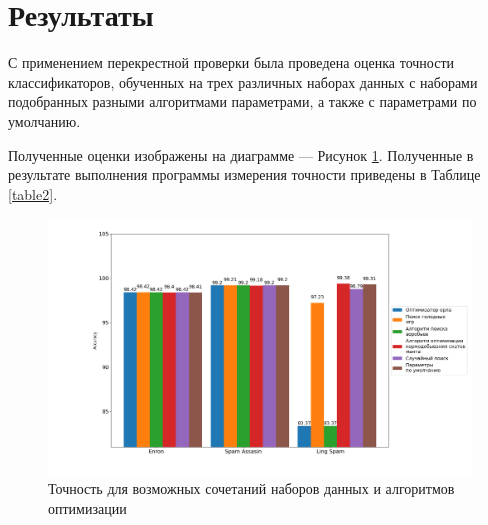 \section{Результаты}

С применением перекрестной проверки была проведена оценка точности классификаторов, обученных на трех различных 
наборах данных с наборами подобранных разными алгоритмами параметрами, а также с параметрами по умолчанию.

Полученные оценки изображены на диаграмме — Рисунок \ref{CrossValAcc}. 
Полученные в результате выполнения программы измерения точности приведены в Таблице \ref{table2}. 

\begin{figure}[H]
    \centering
    \includegraphics[width=165mm]{static/cross-val-acc.png}
    \caption{Точность для возможных сочетаний наборов данных и алгоритмов оптимизации}
    \label{CrossValAcc}
\end{figure}


